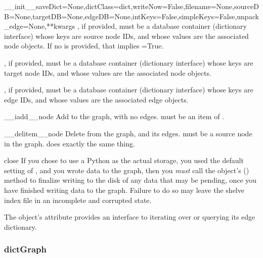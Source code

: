 \documentclass{howto}
\begin{document}
\begin{funcdesc}{__init__}{saveDict=None,dictClass=dict,writeNow=False,filename=None,sourceDB=None,targetDB=None,edgeDB=None,intKeys=False,simpleKeys=False,unpack_edge=None,**kwargs}
  , if provided, must be a database container (dictionary interface) whose
  keys are source node IDs, and whose values are the associated node objects.
  If no  is provided, that implies =True.

  , if provided, must be a database container (dictionary interface) whose
  keys are target node IDs, and whose values are the associated node objects.

  , if provided, must be a database container (dictionary interface) whose
  keys are edge IDs, and whose values are the associated edge objects.
\end{funcdesc}

\begin{funcdesc}{__iadd__}{node}
  Add  to the graph, with no edges.   must be an
  item of .
\end{funcdesc}

\begin{funcdesc}{__delitem__}{node}
  Delete  from the graph, and its edges.   must be a
  source node in the graph.   does exactly the same thing.
\end{funcdesc}

\begin{funcdesc}{close}{}
  If you chose to use a Python  as the actual storage, you used
  the default setting of , and you
  wrote data to the graph, then you {\em must} call the  object's
  () method to finalize writing to the disk of any data that may
  be pending, once you have finished writing data to the graph.  Failure to do
  so may leave the shelve index file in an incomplete and corrupted state.
\end{funcdesc}


The object's  attribute provides an interface to iterating
over or querying its edge dictionary.

\subsubsection{dictGraph}
\end{document}
